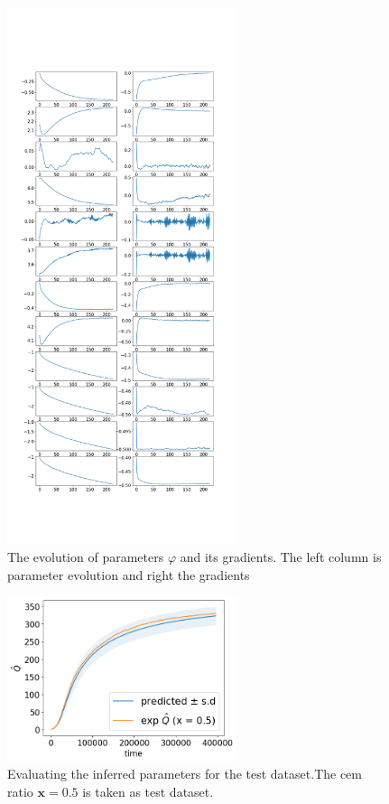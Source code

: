 \documentclass[a4paper,11pt]{article}
\begin{document}
\begin{figure}[!htpb]
    \centering
    \includegraphics[width=0.6\textwidth]{fig/convergance_01_10_2022_17:13pdf.png}
    \caption{The evolution of parameters $\varphi$ and its gradients. The left column is parameter evolution and right the gradients}
    \label{fig:parameter_evolution}
\end{figure}

\begin{figure}[!htpb]
    \centering
    \includegraphics[width=0.6\textwidth]{fig/hydration_model_prediction_01_10_2022_17:13pdf.png}
    \caption{Evaluating the inferred parameters for the test dataset.The cem ratio $\bm x = 0.5$ is taken as test dataset. }
    \label{fig:hydration_model_prediction}
\end{figure}
\end{document}
